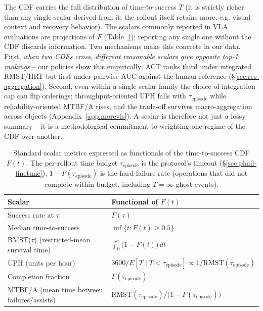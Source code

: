 \documentclass{article}
\begin{document}
The CDF carries the full distribution of time-to-success $T$ (it is strictly richer than any single scalar derived from it; the rollout itself retains more, e.g. visual context and recovery behavior). The scalars commonly reported in VLA evaluations are projections of $F$ (Table~\ref{tab:projections}); reporting any single one without the CDF discards information. Two mechanisms make this concrete in our data. First, \emph{when two CDFs cross, different reasonable scalars give opposite top-1 rankings} -- our policies show this empirically: ACT ranks third under integrated RMST/HRT but first under pairwise AUC against the human reference (\S\ref{sec:res-aggregation}). Second, even within a single scalar family the choice of integration cap can flip orderings: throughput-oriented UPH falls with $\tau_\mathrm{episode}$ while reliability-oriented MTBF/A rises, and the trade-off survives macro-aggregation across objects (Appendix~\ref{app:morevis}). A scalar is therefore not just a lossy summary -- it is a methodological commitment to weighting one regime of the CDF over another.

\begin{table}[H]
\centering
\begin{tabular}{ll}
\toprule
Scalar & Functional of $F(t)$ \\
\midrule
Success rate at $\tau$ & $F(\tau)$ \\
Median time-to-success & $\inf\{t : F(t) \ge 0.5\}$ \\
RMST($\tau$) (restricted-mean survival time) & $\int_0^\tau \big(1 - F(t)\big)\, dt$ \\
UPH (units per hour) & $3600 / E[T \mid T < \tau_\text{episode}] \propto 1 / \text{RMST}(\tau_\text{episode})$ \\
Completion fraction & $F(\tau_\text{episode})$ \\
MTBF/A (mean time between failures/assists) & $\text{RMST}(\tau_\text{episode}) / \big(1 - F(\tau_\text{episode})\big)$ \\
\bottomrule
\end{tabular}
\caption{Standard scalar metrics expressed as functionals of the time-to-success CDF $F(t)$. The per-rollout time budget $\tau_\text{episode}$ is the protocol's timeout (\S\ref{sec:phail-finetune}); $1 - F(\tau_\text{episode})$ is the hard-failure rate (operations that did not complete within budget, including $T = \infty$ ghost events).}
\label{tab:projections}
\end{table}
\end{document}

